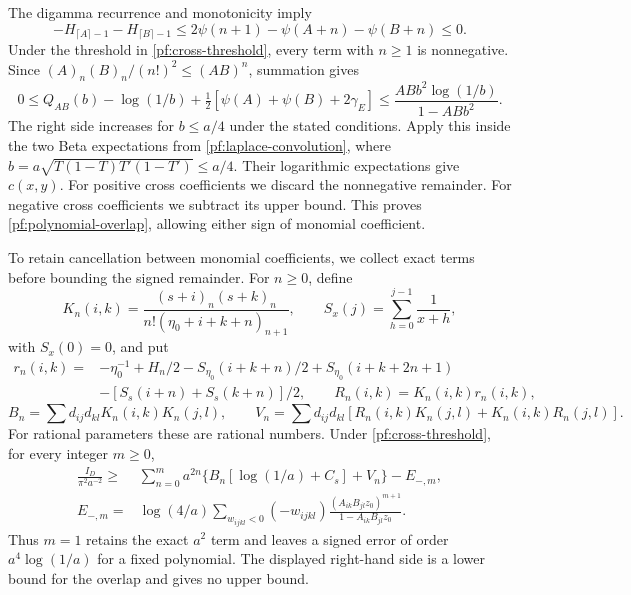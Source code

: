 The digamma recurrence and monotonicity imply
\[
 -H_{\lceil A\rceil-1}-H_{\lceil B\rceil-1}
 \le2\psi(n+1)-\psi(A+n)-\psi(B+n)\le0.
\]
Under the threshold in \eqref{pf:cross-threshold}, every term with
$n\ge1$ is nonnegative. Since $(A)_n(B)_n/(n!)^2\le(AB)^n$, summation gives
\[
 0\le Q_{AB}(b)-\log(1/b)
           +\tfrac12[\psi(A)+\psi(B)+2\gamma_E]
 \le\frac{ABb^2\log(1/b)}{1-ABb^2}.
\]
The right side increases for $b\le a/4$ under the stated conditions.
Apply this inside the two Beta expectations from \eqref{pf:laplace-convolution}, where $b=a\sqrt{T(1-T)T'(1-T')}\le a/4$.
Their logarithmic expectations give $c(x,y)$. For positive cross
coefficients we discard the nonnegative remainder. For negative cross
coefficients we subtract its upper bound. This proves
\eqref{pf:polynomial-overlap}, allowing either sign of monomial
coefficient.

To retain cancellation between monomial coefficients, we collect exact
terms before bounding the signed remainder. For $n\ge0$, define
\[
 K_n(i,k)=\frac{(s+i)_n(s+k)_n}
 {n!(\eta_0+i+k+n)_{n+1}},\qquad
 S_x(j)=\sum_{h=0}^{j-1}\frac1{x+h},
\]
with $S_x(0)=0$, and put
\[
 \begin{split}
 r_n(i,k)={}&-\eta_0^{-1}+H_n/2
 -S_{\eta_0}(i+k+n)/2+S_{\eta_0}(i+k+2n+1)\\
 &-[S_s(i+n)+S_s(k+n)]/2,\qquad R_n(i,k)=K_n(i,k)r_n(i,k),
 \end{split}
\]
\[
 B_n=\sum d_{ij}d_{kl}K_n(i,k)K_n(j,l),\qquad
 V_n=\sum d_{ij}d_{kl}
 [R_n(i,k)K_n(j,l)+K_n(i,k)R_n(j,l)].
\]
For rational parameters these are rational numbers. Under
\eqref{pf:cross-threshold}, for every integer $m\ge0$,
\begin{equation}\label{pf:collected-overlap}
 \begin{split}
 \frac{I_D}{\pi^2a^{-2}}\ge{}&
 \sum_{n=0}^m a^{2n}\{B_n[\log(1/a)+C_s]+V_n\}-E_{-,m},\\
 E_{-,m}={}&\log(4/a)\sum_{w_{ijkl}<0}(-w_{ijkl})
 \frac{(A_{ik}B_{jl}z_0)^{m+1}}{1-A_{ik}B_{jl}z_0}.
 \end{split}
\end{equation}
Thus $m=1$ retains the exact $a^2$ term and leaves a signed error of order
$a^4\log(1/a)$ for a fixed polynomial. The displayed right-hand side is a
lower bound for the overlap and gives no upper bound.


